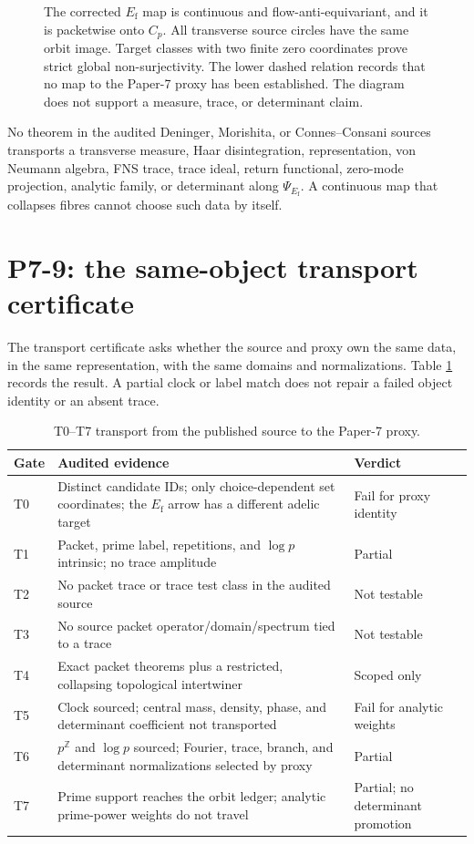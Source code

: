 \documentclass[11pt,a4paper]{article}
\theoremstyle{definition}
\newcommand{\Z}{\mathbb Z}
\newcommand{\Ef}{E_{\mathrm f}}
\begin{document}
\begin{figure}[htbp]
  \centering
  
  \caption{The corrected $\Ef$ map is continuous and flow-anti-equivariant,
  and it is packetwise onto $C_p$.  All transverse source circles have the
  same orbit image.  Target classes with two finite zero coordinates prove
  strict global non-surjectivity.  The lower dashed relation records that no
  map to the Paper-7 proxy has been established.  The diagram does not support
  a measure, trace, or determinant claim.}
  \label{fig:ef}
\end{figure}

No theorem in the audited Deninger, Morishita, or Connes--Consani sources
transports a transverse measure, Haar disintegration, representation,
von Neumann algebra, FNS trace, trace ideal, return functional, zero-mode
projection, analytic family, or determinant along $\Psi_{\Ef}$.  A continuous
map that collapses fibres cannot choose such data by itself.

\section{P7-9: the same-object transport certificate}
\label{sec:p79}

The transport certificate asks whether the source and proxy own the same
data, in the same representation, with the same domains and normalizations.
Table \ref{tab:t0t7} records the result.  A partial clock or label match does
not repair a failed object identity or an absent trace.

\begin{table}[htbp]
\centering
\caption{T0--T7 transport from the published source to the Paper-7 proxy.}
\label{tab:t0t7}
\small
\begin{tabularx}{\textwidth}{@{}p{}p{}X@{}}
\toprule
Gate & Audited evidence & Verdict \\
\midrule
T0 & Distinct candidate IDs; only choice-dependent set coordinates; the
$\Ef$ arrow has a different adelic target & Fail for proxy identity \\
T1 & Packet, prime label, repetitions, and $\log p$ intrinsic; no trace
amplitude & Partial \\
T2 & No packet trace or trace test class in the audited source & Not testable \\
T3 & No source packet operator/domain/spectrum tied to a trace & Not testable \\
T4 & Exact packet theorems plus a restricted, collapsing topological
intertwiner & Scoped only \\
T5 & Clock sourced; central mass, density, phase, and determinant coefficient
not transported & Fail for analytic weights \\
T6 & $p^{\Z}$ and $\log p$ sourced; Fourier, trace, branch, and determinant
normalizations selected by proxy & Partial \\
T7 & Prime support reaches the orbit ledger; analytic prime-power weights do
not travel & Partial; no determinant promotion \\
\bottomrule
\end{tabularx}
\end{table}
\end{document}
